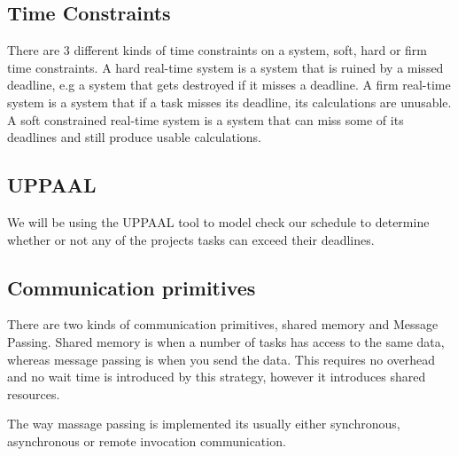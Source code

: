 
\subsection{\textbf{Time Constraints}}
There are 3 different kinds of time constraints on a system, soft, hard or firm time constraints. A hard real-time system is a system that is ruined by a missed deadline, e.g a system that gets destroyed if it misses a deadline. A firm real-time system is a system that if a task misses its deadline, its calculations are unusable. A soft constrained real-time system is a system that can miss some of its deadlines and still produce usable calculations.



\subsection{\textbf{UPPAAL}}
We will be using the UPPAAL tool to model check our schedule to determine whether or not any of the projects tasks can exceed their deadlines.

\subsection{\textbf{Communication primitives}}
There are two kinds of communication primitives, shared memory and Message Passing. 
Shared memory is when a number of tasks has access to the same data, whereas message passing is when you send the data. This requires no overhead and no wait time is introduced by this strategy, however it introduces shared resources.

The way massage passing is implemented its usually either synchronous, asynchronous or remote invocation communication. 

